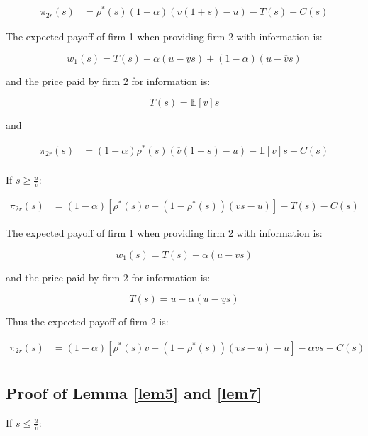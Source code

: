 \documentclass[a4paper,leqno]{article}%
\newcommand{\E}{\mathbb E}
\renewcommand{\a}{\alpha}
\newcommand{\uv}{\underline{v}}
\newcommand{\ov}{\overline{v}}
\begin{document}
\begin{equation}
    \begin{aligned}
\pi_{2r}(s)&=\rho^*(s)(1-\a)(\ov(1+s)-u)-T(s)-C(s)
\end{aligned}
\end{equation}

The expected payoff of firm 1 when providing firm 2 with information is:

$$w_1(s)=T(s)+\a(u-\uv s)+(1-\a)(u-\ov s)$$

and the price paid by firm 2 for information is:

$$T(s)=\E[v]s$$

and 

\begin{equation}
    \begin{aligned}
\pi_{2r}(s)&=(1-\a)\rho^*(s)(\ov(1+s)-u)-\E[v]s-C(s)\\
\end{aligned}
\end{equation}



If $s\geq\frac{u}{\ov}$:

\begin{equation}
    \begin{aligned}
\pi_{2r}(s)&=(1-\a)[\rho^*(s)\ov+(1-\rho^*(s))(\ov s-u)]-T(s)-C(s)
\end{aligned}
\end{equation}

The expected payoff of firm 1 when providing firm 2 with information is:

$$w_1(s)=T(s)+\a(u-\uv s)$$

and the price paid by firm 2 for information is:

$$T(s)=u-\a(u-\uv s)$$

Thus the expected payoff of firm 2 is:

\begin{equation}
    \begin{aligned}
\pi_{2r}(s)&=(1-\a)[\rho^*(s)\ov+(1-\rho^*(s))(\ov s-u)-u]-\a\uv s-C(s)\\
    \end{aligned}
\end{equation}

\subsection{Proof of Lemma \ref{lem5}  and \ref{lem7}}\label{lem5p}


If $s\leq\frac{u}{\ov}$:
\end{document}
